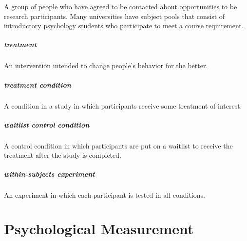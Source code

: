 \documentclass[
]{krantz}
\begin{document}
A group of people who have agreed to be contacted about opportunities to be research participants. Many universities have subject pools that consist of introductory psychology students who participate to meet a course requirement.

\hypertarget{treatment}{%
\paragraph*{treatment}\label{treatment}}

An intervention intended to change people's behavior for the better.

\hypertarget{treatment-condition}{%
\paragraph*{treatment condition}\label{treatment-condition}}

A condition in a study in which participants receive some treatment of interest.

\hypertarget{waitlist-control-condition}{%
\paragraph*{waitlist control condition}\label{waitlist-control-condition}}

A control condition in which participants are put on a waitlist to receive the treatment after the study is completed.

\hypertarget{within-subjects-experiment}{%
\paragraph*{within-subjects experiment}\label{within-subjects-experiment}}

An experiment in which each participant is tested in all conditions.

\hypertarget{psychological-measurement}{%
\chapter{Psychological Measurement}\label{psychological-measurement}}
\end{document}
